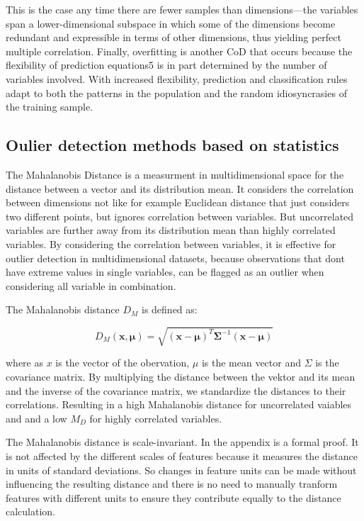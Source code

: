 {This is the case any time there are fewer samples than dimensions—the variables span a lower-dimensional subspace in which some
of the dimensions become redundant and expressible in terms of other dimensions, thus yielding perfect multiple correlation.
Finally, overfitting is another CoD that occurs because the flexibility of prediction equations5 is in part determined
by the number of variables involved. With increased flexibility, prediction and classification rules adapt to both the
patterns in the population and the random idiosyncrasies of the training sample. \citep[p.1pp]{altman2018curse}
}
    
\subsection{Oulier detection methods based on statistics}
The Mahalanobis Distance is a measurment in multidimensional space for the distance between a vector and its distribution mean.
It considers the correlation between dimensions not like for example Euclidean distance that just considers two different points, but ignores correlation between variables. 
But uncorrelated variables are further away from its distribution mean than highly correlated variables. 
By considering the correlation between variables, it is effective for outlier detection in multidimensional datasets, because 
observations that dont have extreme values in single variables, can be flagged as an outlier when considering all variable in combination. 

The Mahalanobis distance $D_M$ is defined as: 

\begin{equation}
    D_M(\mathbf{x}, \mathbf{\mu}) = \sqrt{ (\mathbf{x} - \mathbf{\mu})^T \mathbf{\Sigma}^{-1} (\mathbf{x} - \mathbf{\mu}) }
    \label{eq:mahalanobis}
\end{equation}

where as $x$ is the vector of the obervation, $\mu$ is the mean vector and $\Sigma$ is the covariance matrix. 
By multiplying the distance between the vektor and its mean and the inverse of the covariance matrix, we standardize the distances to their correlations.
Resulting in a high Mahalanobis distance for uncorrelated vaiables and and a low $M_D$ for highly correlated variables.

The Mahalanobis distance is scale-invariant. In the appendix is a formal proof.
It is not affected by the different scales of features because it measures the distance in units of standard deviations.
So changes in feature units can be made without influencing the resulting distance and there is no need to manually tranform features with different
units to ensure they contribute equally to the distance calculation.


